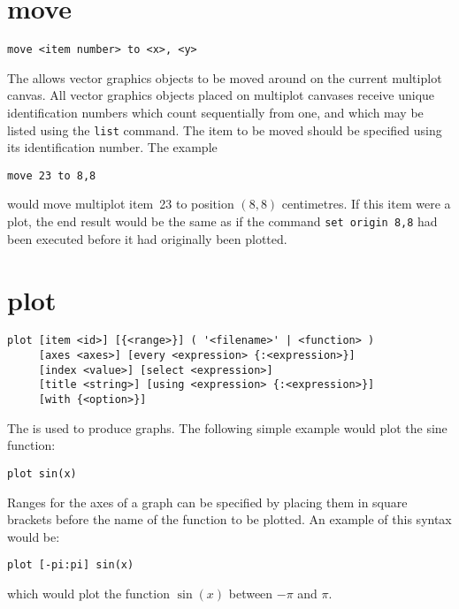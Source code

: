 \section{move}

\begin{verbatim}
move <item number> to <x>, <y>
\end{verbatim}

The  allows vector graphics objects to be moved around on the
current multiplot canvas. All vector graphics objects placed on multiplot
canvases receive unique identification numbers which count sequentially from
one, and which may be listed using the {\tt list} command. The item to be moved
should be specified using its identification number. The example

\begin{verbatim}
move 23 to 8,8
\end{verbatim}

\noindent would move multiplot item~23 to position $(8,8)$ centimetres. If this
item were a plot, the end result would be the same as if the command {\tt set
origin 8,8} had been executed before it had originally been plotted.


\section{plot}

\begin{verbatim}
plot [item <id>] [{<range>}] ( '<filename>' | <function> )
     [axes <axes>] [every <expression> {:<expression>}]
     [index <value>] [select <expression>]
     [title <string>] [using <expression> {:<expression>}]
     [with {<option>}]
\end{verbatim}

The  is used to produce graphs. The following simple example
would plot the sine function:

\begin{verbatim}
plot sin(x)
\end{verbatim}

Ranges for the axes of a graph can be specified by placing them in
square brackets before the name of the function to be plotted. An example of
this syntax would be:

\begin{verbatim}
plot [-pi:pi] sin(x)
\end{verbatim}

\noindent which would plot the function $\sin(x)$ between $-\pi$ and $\pi$.

